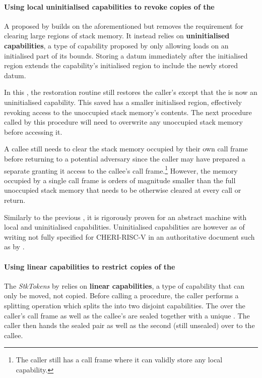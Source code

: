 \documentclass[main.tex]{subfiles}
\begin{document}
\paragraph{Using local uninitialised capabilities to revoke copies of the } A  proposed by \citet{uninitcapss,uninitcaps} builds on the aforementioned  but removes the requirement for clearing large regions of stack memory. It instead relies on \textbf{uninitialised capabilities}, a type of capability proposed by \citet{uninitcapss} only allowing loads on an initialised part of its bounds. Storing a datum immediately after the initialised region extends the capability's initialised region to include the newly stored datum.

In this , the restoration routine still restores the caller's  except that the  is now an uninitialised capability. This saved  has a smaller initialised region, effectively revoking access to the unoccupied stack memory's contents. The next procedure called by this procedure will need to overwrite any unoccupied stack memory before accessing it.

A callee still needs to clear the stack memory occupied by their own call frame before returning to a potential adversary since the caller may have prepared a separate  granting it access to the callee's call frame.\footnote{The caller still has a call frame where it can validly store any local capability.} However, the memory occupied by a single call frame is orders of magnitude smaller than the full unoccupied stack memory that needs to be otherwise cleared at every call or return.

Similarly to the previous , it is rigorously proven for an abstract machine with local and uninitialised capabilities. Uninitialised capabilities are however as of writing not fully specified for CHERI-RISC-V in an authoritative document such as by \citet{cheri}.

\paragraph{Using linear capabilities to restrict copies of the } The \emph{StkTokens}  by \citet{stktokens} relies on \textbf{linear capabilities}, a type of capability that can only be moved, not copied. Before calling a procedure, the caller performs a splitting operation which splits the  into two disjoint capabilities. The  over the caller's call frame as well as the callee's  are sealed together with a unique . The caller then hands the sealed pair as well as the second (still unsealed)  over to the callee.
\end{document}
